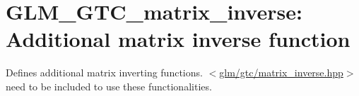 \hypertarget{group__gtc__matrix__inverse}{\section{\-G\-L\-M\-\_\-\-G\-T\-C\-\_\-matrix\-\_\-inverse\-: \-Additional matrix inverse function}
\label{group__gtc__matrix__inverse}
}
\-Defines additional matrix inverting functions. $<$\hyperlink{matrix__inverse_8hpp}{glm/gtc/matrix\-\_\-inverse.\-hpp}$>$ need to be included to use these functionalities. 